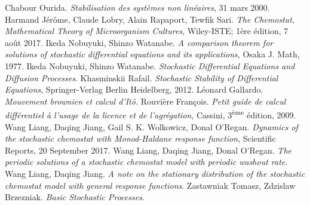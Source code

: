\documentclass[12pt,a4paper]{report}%
\begin{document}
\newpage
\begin{thebibliography}{Dillo 83}
	
	 Chabour Ourida. \emph{Stabilisation des systèmes non linéaires}, 31 mars 2000.
	 Harmand Jérôme, Claude Lobry, Alain Rapaport, Tewfik Sari. \emph{The Chemostat, Mathematical Theory of Microorganism Cultures}, Wiley-ISTE; 1ère édition, 7 août 2017.
	 Ikeda Nobuyuki, Shinzo Watanabe. \emph{A comparison theorem for solutions of stochastic differential equations and its applications}, Osaka J. Math, 1977.
	 Ikeda Nobuyuki, Shinzo Watanabe. \emph{	Stochastic Differential Equations and Diffusion Processes}.
	 Khasminskii Rafail. \emph{Stochastic Stability of Differential Equations}, Springer-Verlag Berlin Heidelberg, 2012.
	 Léonard Gallardo. \emph{Mouvement brownien et calcul d'Itô.}
	 Rouvière François. \emph{Petit guide de calcul différentiel à l'usage de la licence et de l'agrégation}, Cassini, 3\textsuperscript{ème} édition, 2009.
	 Wang Liang, Daqing Jiang, Gail S. K. Wolkowicz, Donal O’Regan. \emph{Dynamics of the stochastic chemostat with Monod-Haldane response function}, Scientific Reports, 20 September 2017.
	 Wang Liang, Daqing Jiang, Donal O’Regan. \emph{The periodic solutions of a stochastic chemostat model with periodic washout rate}.
	 Wang Liang, Daqing Jiang. \emph{ A note on the stationary distribution of the stochastic chemostat model with general response functions}.
	Zastawniak Tomasz, Zdzislaw Brzezniak. \emph{Basic Stochastic Processes}.
	

\end{thebibliography}

\end{document}
